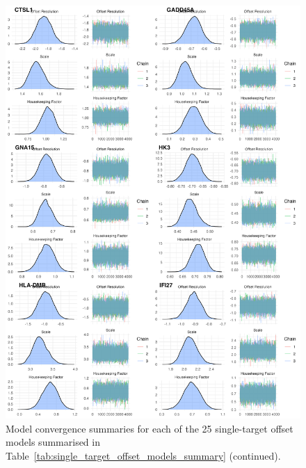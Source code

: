 \documentclass[../thesis.tex]{subfiles}
\begin{document}
\begin{figure}
    \centering
    \includegraphics[width=\textwidth]{figures/chapter2/model_summaries_2.png}
    \caption{Model convergence summaries for each of the 25 single-target offset models summarised in Table~\ref{tab:single_target_offset_models_summary} (continued).}
    \label{fig:convergence_2}
\end{figure}
\end{document}
